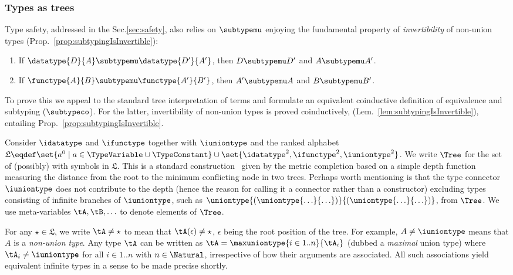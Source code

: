 \subsubsection{Types as trees}
\label{sec:typingCoinductive}


Type safety, addressed in the Sec.\ref{sec:safety}, also relies on $\subtypemu$
enjoying the fundamental property of \emph{invertibility} of non-union types
(\cf Prop.~\ref{prop:subtypingIsInvertible}):
\begin{enumerate}
  \item If $\datatype{D}{A} \subtypemu \datatype{D'}{A'}$, then $D \subtypemu
  D'$ and $A \subtypemu A'$.
  \item If $\functype{A}{B} \subtypemu \functype{A'}{B'}$, then $A' \subtypemu
  A$ and $B \subtypemu B'$.
\end{enumerate}


To prove this we appeal to the standard tree interpretation of terms and
formulate an equivalent coinductive definition of equivalence and subtyping
($\subtypeco$). For the latter, invertibility of non-union types is proved
coinductively, (Lem.~\ref{lem:subtypingIsInvertible}), entailing Prop.~\ref{prop:subtypingIsInvertible}.

Consider  $\idatatype$ and $\ifunctype$ together
with  $\iuniontype$ and the ranked alphabet
$\mathfrak{L} \eqdef \set{a^0 \mathrel| a \in \TypeVariable \cup \TypeConstant}
\cup \set{\idatatype^2, \ifunctype^2, \iuniontype^2}$.  We write $\Tree$ for
the set of (possibly)  with symbols in $\mathfrak{L}$.
This is a standard construction~\cite{terese03,journals/tcs/Courcelle83} given
by the metric completion based on a simple depth function measuring the
distance from the root to the minimum conflicting node in two trees.
Perhaps worth mentioning is that the type connector $\iuniontype$ does not
contribute to the depth (hence the reason for calling it a connector rather
than a constructor) excluding types consisting of infinite branches of
$\iuniontype$, such as $\uniontype{(\uniontype{\ldots}{\ldots})}{(\uniontype{\ldots}{\ldots})}$,
from $\Tree$. We use meta-variables $\tA, \tB, \ldots$ to denote elements of
$\Tree$.

\begin{remark}
\label{rem:maximalUnionTypes}
For any $\star \in \mathfrak{L}$, we write $\tA \neq \star$ to mean that
$\tA(\epsilon) \neq \star$, $\epsilon$ being the root position of the tree. For
example, $A \neq \iuniontype$ means that $A$ is a \emph{non-union type}. Any
type $\tA$ can be written as $\tA = \maxuniontype{i \in 1..n}{\tA_i}$ (dubbed a
\emph{maximal} union type) where $\tA_i \neq \iuniontype$ for all $i \in 1..n$
with $n\in \Natural$, irrespective of how their arguments are associated. All
such associations yield equivalent infinite types in a sense to be made precise
shortly.
\end{remark}




